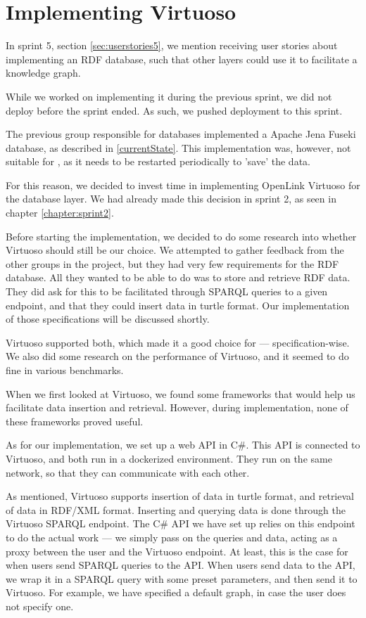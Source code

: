 \section{Implementing Virtuoso}
In sprint 5, section \ref{sec:userstories5}, we mention receiving user stories about implementing an RDF database, such that other \knox{} layers could use it to facilitate a knowledge graph.

While we worked on implementing it during the previous sprint, we did not deploy before the sprint ended. As such, we pushed deployment to this sprint.

The previous group responsible for \knox{} databases implemented a Apache Jena Fuseki database, as described in \ref{currentState}.
This implementation was, however, not suitable for \knox{}, as it needs to be restarted periodically to 'save' the data.

For this reason, we decided to invest time in implementing OpenLink Virtuoso for the \knox{} database layer. We had already made this decision in sprint 2, as seen in chapter \ref{chapter:sprint2}.

Before starting the implementation, we decided to do some research into whether Virtuoso should still be our choice.
We attempted to gather feedback from the other groups in the \knox{} project, but they had very few requirements for the RDF database. All they wanted to be able to do was to store and retrieve RDF data.
They did ask for this to be facilitated through SPARQL queries to a given endpoint, and that they could insert data in turtle format. Our implementation of those specifications will be discussed shortly.

Virtuoso supported both, which made it a good choice for \knox{} --- specification-wise. We also did some research on the performance of Virtuoso, and it seemed to do fine in various benchmarks\cite{addleseeComparingLinkedData2019}\cite{jovanovikBenchmarkingVirtuosoMighty2018}.

When we first looked at Virtuoso, we found some frameworks that would help us facilitate data insertion and retrieval. However, during implementation, none of these frameworks proved useful.

As for our implementation, we set up a web API in C\#. This API is connected to Virtuoso, and both run in a dockerized environment. They run on the same network, so that they can communicate with each other.

As mentioned, Virtuoso supports insertion of data in turtle format, and retrieval of data in RDF/XML format. Inserting and querying data is done through the Virtuoso SPARQL endpoint. The C\# API we have set up relies on this endpoint to do the actual work --- we simply pass on the queries and data, acting as a proxy between the user and the Virtuoso endpoint. At least, this is the case for when users send SPARQL queries to the API. When users send data to the API, we wrap it in a SPARQL query with some preset parameters, and then send it to Virtuoso. For example, we have specified a default graph, in case the user does not specify one.

